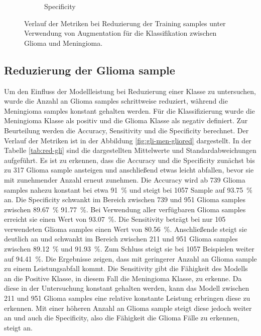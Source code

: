 \begin{figure}[H]
\begin{subfigure}[b]{0.48\textwidth}
    \caption{Specificity}
    \label{fig:augm-spec}
  \end{subfigure}
  \caption{Verlauf der Metriken bei Reduzierung der Training samples unter Verwendung von Augmentation für die Klassifikation zwischen Glioma und Meningioma.}
  \label{fig:gli-men-augm}
\end{figure}

\subsection{Reduzierung der Glioma sample}
Um den Einfluss der Modellleistung bei Reduzierung einer Klasse zu untersuchen, wurde die Anzahl an Glioma samples schrittweise reduziert, während die Meningioma samples konstant gehalten werden.
Für die Klassifizierung wurde die Meningioma Klasse als positiv und die Glioma Klasse als negativ definiert. 
Zur Beurteilung werden die Accuracy, Sensitivity und die Specificity berechnet.
Der Verlauf der Metriken ist in der Abbildung \ref{fig:gli-men-gliored} dargestellt.
In der Tabelle \ref{tab:red-gli} sind die dargestellten Mittelwerte und Standardabweichungen aufgeführt. 
Es ist zu erkennen, dass die Accuracy und die Specificity zunächst bis zu 317 Glioma sample ansteigen und anschließend etwas leicht abfallen,
bevor sie mit zunehmender Anzahl erneut zunehmen. 
Die Accuracy wird ab 739 Glioma samples nahezu konstant bei etwa \SI{91}{\percent} und steigt bei 1057 Sample auf \SI{93.75}{\percent} an.
Die Specificity schwankt im Bereich zwischen 739 und 951 Glioma samples zwischen \SI{89.67}{\%} \SI{91.77}{\%}.
Bei Verwendung aller verfügbaren Glioma samples erreicht sie einen Wert von \SI{93.07}{\%}.
Die Sensitivity beträgt bei nur 105 verwendeten Glioma samples einen Wert von \SI{80.56}{\%}.
Anschließende steigt sie deutlich an und schwankt im Bereich zwischen 211 und 951 Glioma samples zwischen \SI{89.12}{\%} und \SI{91.93}{\%}. 
Zum Schluss steigt sie bei 1057 Beispielen weiter auf \SI{94.41}{\%}.
Die Ergebnisse zeigen, dass mit geringerer Anzahl an Glioma sample zu einem Leistungsabfall kommt.
Die Sensitivity gibt die Fähigkeit des Modells an die Positive Klasse, in diesem Fall die Meningioma Klasse, zu erkenne.
Da diese in der Untersuchung konstant gehalten werden, kann das Modell zwischen 211 und 951 Glioma samples eine relative konstante Leistung erbringen diese zu erkennen.
Mit einer höheren Anzahl an Glioma sample steigt diese jedoch weiter an und auch die Specificity, also die Fähigkeit die Glioma Fälle zu erkennen, steigt an. 
